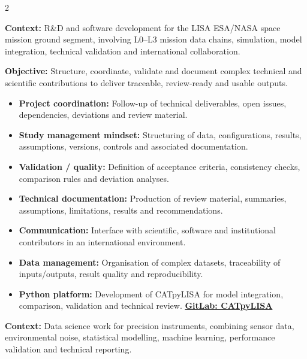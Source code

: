 \documentclass[8pt,a4paper,ragged2e,withhyper]{altacv}
\begin{document}
\begin{paracol}{2}
\divider


\textbf{Context:} R\&D and software development for the LISA ESA/NASA space mission ground segment, involving L0--L3 mission data chains, simulation, model integration, technical validation and international collaboration.

\textbf{Objective:} Structure, coordinate, validate and document complex technical and scientific contributions to deliver traceable, review-ready and usable outputs.

\begin{itemize}
  \item \textbf{Project coordination:} Follow-up of technical deliverables, open issues, dependencies, deviations and review material.
  \item \textbf{Study management mindset:} Structuring of data, configurations, results, assumptions, versions, controls and associated documentation.
  \item \textbf{Validation / quality:} Definition of acceptance criteria, consistency checks, comparison rules and deviation analyses.
  \item \textbf{Technical documentation:} Production of review material, summaries, assumptions, limitations, results and recommendations.
  \item \textbf{Communication:} Interface with scientific, software and institutional contributors in an international environment.
  \item \textbf{Data management:} Organisation of complex datasets, traceability of inputs/outputs, result quality and reproducibility.
  \item \textbf{Python platform:} Development of CATpyLISA for model integration, comparison, validation and technical review.
  \textcolor{DarkPastelRed}{\href{https://gitlab.oca.eu/gboileau/lisa_l3_tools}{\bf GitLab: CATpyLISA}}
\end{itemize}

\divider


\textbf{Context:} Data science work for precision instruments, combining sensor data, environmental noise, statistical modelling, machine learning, performance validation and technical reporting.


\end{paracol}
\end{document}
